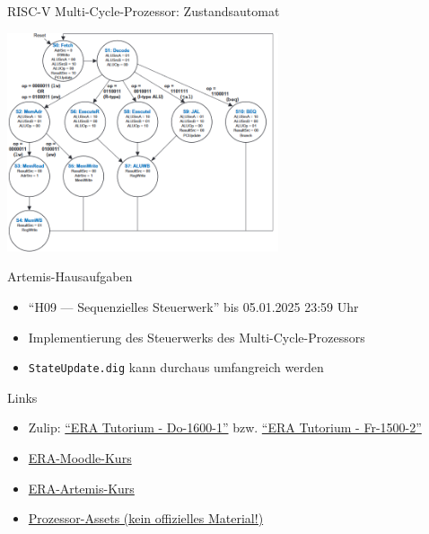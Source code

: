 \documentclass[
  german,            %
  aspectratio=169,    %
]{tumbeamer}
\begin{document}
\begin{frame}[c]{RISC-V Multi-Cycle-Prozessor: Zustandsautomat}{}
	\begin{center}
		\includegraphics[width=0.6\textwidth]{w09_multicycle_states.png}
	\end{center}
	\centering
\end{frame}

\begin{frame}[c, fragile]{Artemis-Hausaufgaben}{}
	\begin{itemize}
		\item \enquote{H09 --- Sequenzielles Steuerwerk} bis 05.01.2025 23:59 Uhr
		\item Implementierung des Steuerwerks des Multi-Cycle-Prozessors
		\item \texttt{StateUpdate.dig} kann durchaus umfangreich werden
	\end{itemize}
\end{frame}

\begin{frame}[c, fragile]{Links}{}
	\begin{itemize}
		\item Zulip: \href{https://zulip.in.tum.de/#narrow/stream/2661-ERA-Tutorium---Do-1600-1}{\enquote{ERA Tutorium - Do-1600-1}}
		      bzw. \href{https://zulip.in.tum.de/#narrow/stream/2675-ERA-Tutorium---Fr-1500-2 }{\enquote{ERA Tutorium - Fr-1500-2}}
		\item \href{https://www.moodle.tum.de/course/view.php?id=100633}{ERA-Moodle-Kurs}
		\item \href{https://artemis.in.tum.de/courses/401}{ERA-Artemis-Kurs}
		\item \href{https://courses.edx.org/assets/courseware/v1/f06a2dc0c856f60ec0711e9f5e1c98cf/asset-v1:HarveyMuddX+ENGR85B+1T2023+type@asset+block/FinalReferences.pdf}{Prozessor-Assets (kein offizielles Material!)}
	\end{itemize}
\end{frame}

\maketitle
\end{document}
